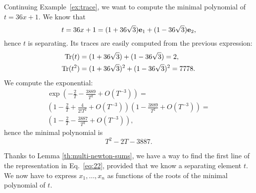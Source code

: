 \begin{example}
  Continuing Example~\ref{ex:trace}, we want to compute the minimal
  polynomial of $t=36x+1$. We know that
  \[t=36x + 1 = (1+36\sqrt{3})\mathbf{e}_1 + (1-36\sqrt{3})\mathbf{e}_2
  \text{,}\] hence $t$ is separating. Its traces are easily computed
  from the previous expression:
  \begin{align*}
    \operatorname{Tr}(t) &= (1 + 36\sqrt{3}) + (1-36\sqrt{3}) = 2\text{,}\\
    \operatorname{Tr}(t^2) &= (1 + 36\sqrt{3})^2 + (1-36\sqrt{3})^2 = 7778\text{.}
  \end{align*}
  We compute the exponential:
  \begin{multline*}
    \exp\left(-\frac{2}{T}-\frac{3889}{T^2} + O(T^{-3})\right)=\\
    \left(1-\frac{2}{T}+\frac{4}{2!T^2}+O(T^{-3})\right)\left(1-\frac{3889}{T^2}+O(T^{-3})\right)=\\
    \left(1 - \frac{2}{T} - \frac{3887}{T^2} + O(T^{-3})\right)
    \text{,}
  \end{multline*}
  hence the minimal polynomial is
  \[T^2-2T-3887\text{.}\]
\end{example}

Thanks to Lemma \ref{th:multi-newton-sums}, we have a way to find the
first line of the representation in Eq.~\eqref{eq:22}, provided that
we know a separating element $t$. We now have to express
$x_1,\ldots,x_n$ as functions of the roots of the minimal polynomial of $t$.

